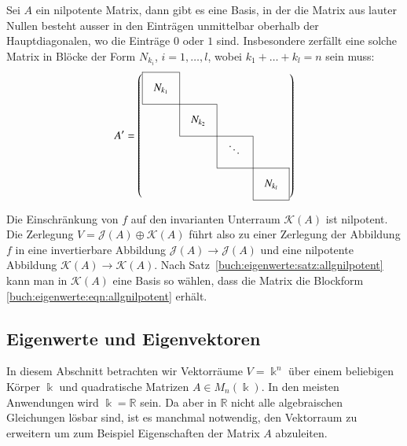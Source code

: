 \begin{satz}
\label{buch:eigenwerte:satz:allgnilpotent}
Sei $A$ ein nilpotente Matrix, dann gibt es eine Basis, in der die Matrix
aus lauter Nullen besteht ausser in den Einträgen unmittelbar oberhalb der 
Hauptdiagonalen, wo die Einträge $0$ oder $1$ sind.
Insbesondere zerfällt eine solche Matrix in Blöcke der Form $N_{k_i}$,
$i=1,\dots,l$,
wobei $k_1+\dots+k_l=n$ sein muss:
\begin{equation}
\def\temp#1{\multicolumn{1}{|c}{\raisebox{0pt}[17pt][12pt]{\phantom{x}$#1\mathstrut$}\phantom{x}}}
A'
=\left(
\begin{array}{cccc}
\cline{1-1}
\temp{N_{k_1}} &\multicolumn{1}{|c}{}&        &           \\
\cline{1-2}
          &\temp{N_{k_2}}&\multicolumn{1}{|c}{}&           \\
\cline{2-3}
          &           &\temp{\ddots}&\multicolumn{1}{|c}{}\\
\cline{3-4}
          &           &        &\multicolumn{1}{|c|}{\raisebox{0pt}[17pt][12pt]{\phantom{x}$N_{k_l}$}\phantom{x}}\\
\cline{4-4}
\end{array}
\right)
\label{buch:eigenwerte:eqn:allgnilpotent}
\end{equation}
\end{satz}

Die Einschränkung von $f$ auf den invarianten Unterraum $\mathcal{K}(A)$
ist nilpotent.
Die Zerlegung $V=\mathcal{J}(A)\oplus \mathcal{K}(A)$ führt also zu einer
Zerlegung der Abbildung $f$ in eine invertierbare Abbildung
$\mathcal{J}(A)\to\mathcal{J}(A)$ und eine
nilpotente Abbildung $\mathcal{K}(A)\to\mathcal{K}(A)$.
Nach Satz~\ref{buch:eigenwerte:satz:allgnilpotent} kann man in
$\mathcal{K}(A)$ eine Basis so wählen, dass die Matrix die Blockform
\eqref{buch:eigenwerte:eqn:allgnilpotent} erhält.

%
%
\subsection{Eigenwerte und Eigenvektoren
\label{buch:subsection:eigenwerte-und-eigenvektoren}}
In diesem Abschnitt betrachten wir Vektorräume $V=\Bbbk^n$ über einem
beliebigen Körper $\Bbbk$ und quadratische Matrizen
$A\in M_n(\Bbbk)$.
In den meisten Anwendungen wird $\Bbbk=\mathbb{R}$ sein.
Da aber in $\mathbb{R}$ nicht alle algebraischen Gleichungen lösbar sind,
ist es manchmal notwendig, den Vektorraum zu erweitern um zum Beispiel
Eigenschaften der Matrix $A$ abzuleiten.

